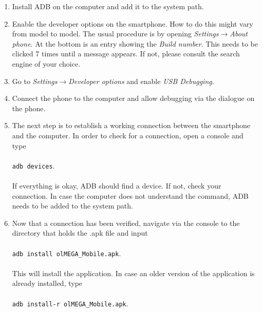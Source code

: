 \documentclass[11pt,a4paper,titlepage]{article}
\begin{document}
\begin{enumerate}

\vspace{0.5cm}

	\item Install ADB on the computer and add it to the system path.\\
	 
	\item Enable the developer options on the smartphone. How to do this might vary from model to model. The usual procedure is by opening \textit{Settings$\rightarrow$About phone}. At the bottom is an entry showing the \textit{Build number}. This needs to be clicked 7 times until a message appears. If not, please consult the search engine of your choice.\\
	
	\item Go to \textit{Settings}$\rightarrow$\textit{Developer options} and enable \textit{USB Debugging}.\\
	
	\item Connect the phone to the computer and allow debugging via the dialogue on the phone.\\
	
	\item The next step is to establish a working connection between the smartphone and the computer. In order to check for a connection, open a console and type\\
	\\
	\colorbox{black!10}{\texttt{adb devices}}.\\
	\\
	If everything is okay, ADB should find a device. If not, check your connection. In case the computer does not understand the command, ADB needs to be added to the system path.\\
	
	\item Now that a connection has been verified, navigate via the console to the directory that holds the .apk file and input\\
	\\
	\colorbox{black!10}{\texttt{adb install olMEGA\_Mobile.apk}}.\\
	\\
	This will install the application. In case an older version of the application is already installed, type\\
	\\
	\colorbox{black!10}{\texttt{adb install-r olMEGA\_Mobile.apk}}.\\
	

\end{enumerate}
\end{document}
